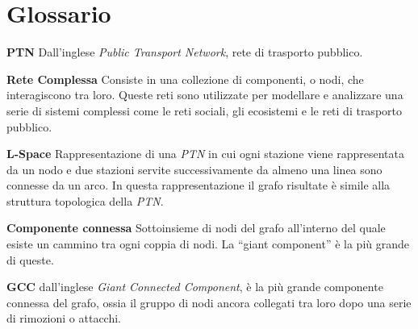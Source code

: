 
\chapter*{Glossario}


\textbf{PTN} Dall'inglese \textit{Public Transport Network}, rete di trasporto pubblico.

\textbf{Rete Complessa} Consiste in una collezione di componenti, o nodi, che interagiscono tra loro. Queste reti sono utilizzate per modellare e analizzare una serie di sistemi complessi come le reti sociali, gli ecosistemi e le reti di trasporto pubblico.

\textbf{L-Space} Rappresentazione di una \textit{PTN} in cui ogni stazione viene rappresentata da un nodo e due stazioni servite successivamente da almeno una linea sono connesse da un arco. In questa rappresentazione il grafo risultate è simile alla struttura topologica della \textit{PTN}.

\textbf{Componente connessa} Sottoinsieme di nodi del grafo all’interno del quale esiste un cammino tra ogni coppia di nodi. La “giant component” è la più grande di queste.

\textbf{GCC} dall'inglese \textit{Giant Connected Component}, è la più grande componente connessa del grafo, ossia il gruppo di nodi ancora collegati tra loro dopo una serie di rimozioni o attacchi.